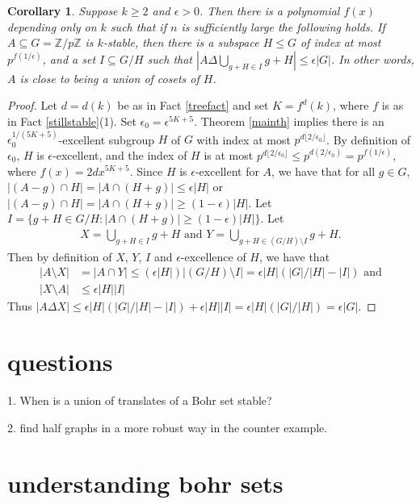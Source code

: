 \documentclass[11pt]{article}
\newtheorem{corollary}{Corollary}
\theoremstyle{definition}
\begin{document}
\begin{corollary}
Suppose $k\geq 2$ and $\epsilon>0$.  Then there is a polynomial $f(x)$ depending only on $k$ such that if $n$ is sufficiently large the following holds.  If $A\subseteq G=\mathbb{Z}/p\mathbb{Z}$ is $k$-stable, then there is a subspace $H\leq G$ of index at most $p^{f(1/\epsilon)}$, and a set $I\subseteq G/H$ such that $|A\Delta \bigcup_{g+H\in I} g+H|\leq \epsilon |G|$.  In other words, $A$ is close to being a union of cosets of $H$.
\end{corollary}
\begin{proof}
Let $d=d(k)$ be as in Fact \ref{treefact} and set $K=f^d(k)$, where $f$ is as in Fact \ref{stillstable}(1).  Set $\epsilon_0=\epsilon^{5K+5}$.  Theorem \ref{mainth} implies there is an $\epsilon_0^{1/(5K+5)}$-excellent subgroup $H$ of $G$ with index at most $p^{d\lfloor 2/\epsilon_0\rfloor}$.  By definition of $\epsilon_0$, $H$ is $\epsilon$-excellent, and the index of $H$ is at most $p^{d\lfloor 2/\epsilon_0\rfloor} \leq p^{d(2/\epsilon_0)}=p^{f(1/\epsilon)}$, where $f(x)=2dx^{5K+5}$.  Since $H$ is $\epsilon$-excellent for $A$, we have that for all $g\in G$, $|(A-g)\cap H|=|A\cap (H+g)|\leq \epsilon |H|$ or $|(A-g)\cap H|=|A\cap (H+g)|\geq (1-\epsilon) |H|$.  Let $I=\{g+H\in G/H: |A\cap (H+g)|\geq (1-\epsilon) |H|\}$.  Let 
\begin{align*}
X=\bigcup_{g+H\in I}g+H\text{ and }Y=\bigcup_{g+H\in (G/H)\setminus I}g+H. 
\end{align*}
Then by definition of $X$, $Y$, $I$ and $\epsilon$-excellence of $H$, we have that 
\begin{align*}
|A\setminus X|&=|A\cap Y|\leq (\epsilon |H|)|(G/H)\setminus I|=\epsilon|H|(|G|/|H|-|I|)\text{ and}\\
|X\setminus A|&\leq \epsilon |H||I| 
\end{align*}
Thus $|A\Delta X|\leq \epsilon|H|(|G|/|H|-|I|)+\epsilon |H||I| = \epsilon |H|(|G|/|H|)=\epsilon |G|$.
\end{proof}


\section{questions}

1. When is a union of translates of a Bohr set stable? 

2. find half graphs in a more robust way in the counter example.


\section{understanding bohr sets}
\end{document}
